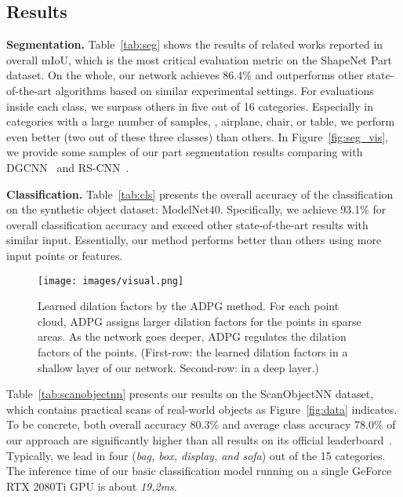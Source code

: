 \documentclass[10pt,twocolumn,letterpaper]{article}
\begin{document}
\subsection{Results}
\noindent \textbf{Segmentation.} Table~\ref{tab:seg} shows the results of related works reported in overall mIoU, which is the most critical evaluation metric on the ShapeNet Part dataset. On the whole, our network achieves 86.4\% and outperforms other state-of-the-art algorithms based on similar experimental settings. For evaluations inside each class, we surpass others in five out of 16 categories. Especially in categories with a large number of samples, \eg, airplane, chair, or table, we perform even better (two out of these three classes) than others. In Figure~\ref{fig:seg_vis}, we provide some samples of our part segmentation results comparing with DGCNN~\cite{wang2019dynamic} and RS-CNN~\cite{liu2019relation}.

\noindent \textbf{Classification.}   Table~\ref{tab:cls} presents the overall accuracy of the classification on the synthetic object dataset: ModelNet40. Specifically, we achieve 93.1\% for overall classification accuracy and exceed other state-of-the-art results with similar input. Essentially, our method performs better than others using more input points or features. 

\begin{figure*}
\begin{center}
\texttt{[image: images/visual.png]}
\end{center}
\caption{Learned dilation factors by the ADPG method. For each point cloud, ADPG assigns larger dilation factors for the points in sparse areas. As the network goes deeper, ADPG regulates the dilation factors of the points. (First-row: the learned dilation factors in a shallow layer of our network. Second-row: in a deep layer.)}
\label{fig:visual}
\end{figure*}

Table~\ref{tab:scanobjectnn} presents our results on the ScanObjectNN dataset, which contains practical scans of real-world objects as Figure~\ref{fig:data} indicates. To be concrete, both overall accuracy 80.3\% and average class accuracy 78.0\% of our approach are significantly higher than all results on its official leaderboard~\cite{scanWeb}. Typically, we lead in four (\emph{bag, box, display, and sofa}) out of the 15 categories. The inference time of our basic classification model running on a single GeForce RTX 2080Ti GPU is about \emph{19.2ms}.
\end{document}
